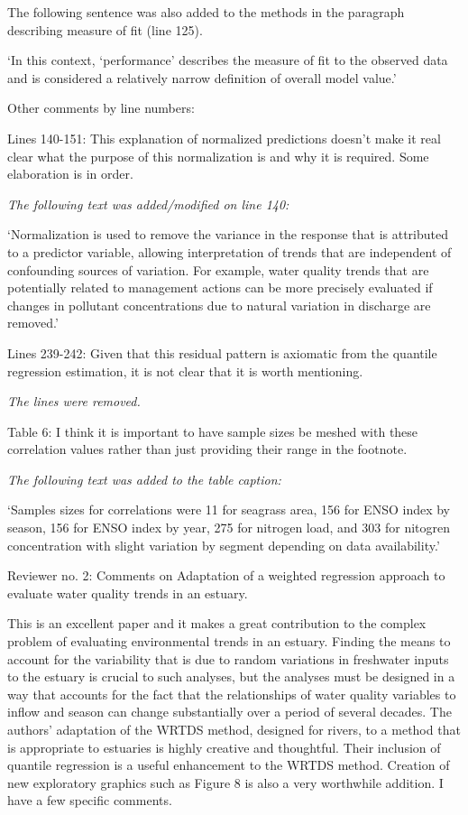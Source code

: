 \documentclass[letterpaper,12pt,oneside]{article}\usepackage[]{graphicx}\usepackage[]{color}
\begin{document}
{The following sentence was also added to the methods in the paragraph describing measure of fit (line 125).  

`In this context, `performance' describes the measure of fit to the observed data and is considered a relatively narrow definition of overall model value.'
}

Other comments by line numbers:

Lines 140-151:  This explanation of normalized predictions doesn't make it real clear what the purpose of this normalization is and why it is required.  Some elaboration is in order. 

{\it The following text was added/modified on line 140: 

`Normalization is used to remove the variance in the response that is attributed to a predictor variable, allowing interpretation of trends that are independent of confounding sources of variation. For example, water quality trends that are potentially related to management actions can be more precisely evaluated if changes in pollutant concentrations due to natural variation in discharge are removed.'}

Lines 239-242:  Given that this residual pattern is axiomatic from the quantile regression estimation, it is not clear that it is worth mentioning. 

{\it The lines were removed.}

Table 6:  I think it is important to have sample sizes be meshed with these correlation values rather than just providing their range in the footnote.

{\it The following text was added to the table caption:

`Samples sizes for correlations were 11 for seagrass area, 156 for ENSO index by season, 156 for ENSO index by year, 275 for nitrogen load, and 303 for nitogren concentration with slight variation by segment depending on data availability.'}
 

Reviewer no. 2: Comments on Adaptation of a weighted regression approach to evaluate water quality trends in an estuary.

This is an excellent paper and it makes a great contribution to the complex problem of evaluating environmental trends in an estuary.  Finding the means to account for the variability that is due to random variations in freshwater inputs to the estuary is crucial to such analyses, but the analyses must be designed in a way that accounts for the fact that the relationships of water quality variables to inflow and season can change substantially over a period of several decades.  The authors' adaptation of the WRTDS method, designed for rivers, to a method that is appropriate to estuaries is highly creative and thoughtful.  Their inclusion of quantile regression is a useful enhancement to the WRTDS method.  Creation of new exploratory graphics such as Figure 8 is also a very worthwhile addition.  I have a few specific comments.
\end{document}
